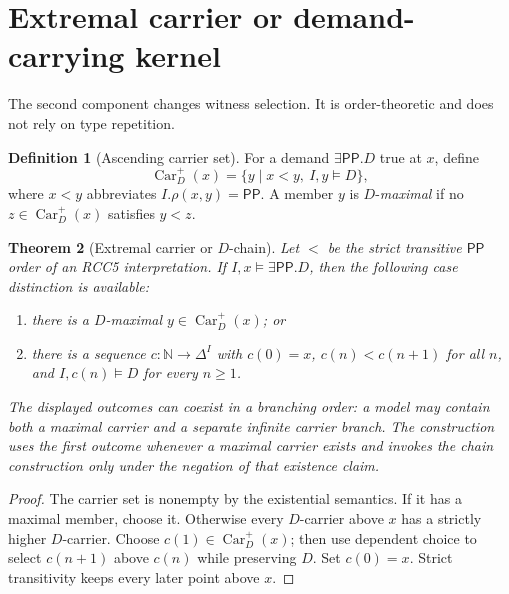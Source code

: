 \documentclass[11pt,letterpaper]{article}
\newcommand{\PP}{\ensuremath{\mathsf{PP}}}
\newcommand{\sat}{\models}
\newcommand{\Car}{\operatorname{Car}}
\theoremstyle{definition}
\newtheorem{definition}{Definition}[section]
\theoremstyle{plain}
\newtheorem{theorem}[definition]{Theorem}
\theoremstyle{remark}
\begin{document}
\section{Extremal carrier or demand-carrying kernel}

The second component changes witness selection.  It is order-theoretic and does
not rely on type repetition.

\begin{definition}[Ascending carrier set]
For a demand $\exists\PP.D$ true at $x$, define
\[
  \Car_D^+(x)
  =\{y \mid x<y,\ I,y\sat D\},
\]
where $x<y$ abbreviates $I.\rho(x,y)=\PP$.  A member $y$ is
$D$-\emph{maximal} if no $z\in\Car_D^+(x)$ satisfies $y<z$.
\end{definition}

\begin{theorem}[Extremal carrier or $D$-chain]\label{thm:dichotomy}
Let $<$ be the strict transitive $\PP$ order of an RCC5 interpretation.  If
$I,x\sat\exists\PP.D$, then the following case distinction is available:
\begin{enumerate}
  \item there is a $D$-maximal $y\in\Car_D^+(x)$; or
  \item there is a sequence $c:\mathbb{N}\to\Delta^I$ with $c(0)=x$,
        $c(n)<c(n+1)$ for all $n$, and $I,c(n)\sat D$ for every $n\geq 1$.
\end{enumerate}
The displayed outcomes can coexist in a branching order: a model may contain
both a maximal carrier and a separate infinite carrier branch.  The construction
uses the first outcome whenever a maximal carrier exists and invokes the chain
construction only under the negation of that existence claim.
\end{theorem}

\begin{proof}
The carrier set is nonempty by the existential semantics.  If it has a maximal
member, choose it.  Otherwise every $D$-carrier above $x$ has a strictly higher
$D$-carrier.  Choose $c(1)\in\Car_D^+(x)$; then use dependent choice to select
$c(n+1)$ above $c(n)$ while preserving $D$.  Set $c(0)=x$.  Strict transitivity
keeps every later point above $x$.
\end{proof}
\end{document}
